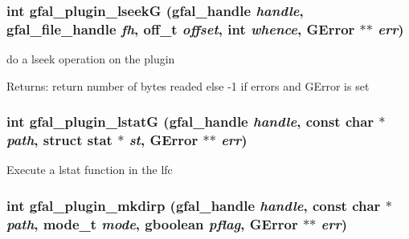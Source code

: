 \subsubsection{\setlength{\rightskip}{0pt plus 5cm}int gfal\_\-plugin\_\-lseek\-G (gfal\_\-handle {\em handle}, gfal\_\-file\_\-handle {\em fh}, off\_\-t {\em offset}, int {\em whence}, GError $\ast$$\ast$ {\em err})}\label{gfal__common__plugin_8c_c29b06ae43aa86049b513d1174393019}


do a lseek operation on the plugin \begin{Desc}
\item[Returns:]return number of bytes readed else -1 if errors and GError is set \end{Desc}
\subsubsection{\setlength{\rightskip}{0pt plus 5cm}int gfal\_\-plugin\_\-lstat\-G (gfal\_\-handle {\em handle}, const char $\ast$ {\em path}, struct stat $\ast$ {\em st}, GError $\ast$$\ast$ {\em err})}\label{gfal__common__plugin_8c_81a0d301234958fc59518fb6ce306425}


Execute a lstat function in the lfc 
\subsubsection{\setlength{\rightskip}{0pt plus 5cm}int gfal\_\-plugin\_\-mkdirp (gfal\_\-handle {\em handle}, const char $\ast$ {\em path}, mode\_\-t {\em mode}, gboolean {\em pflag}, GError $\ast$$\ast$ {\em err})}\label{gfal__common__plugin_8c_815a97902a1067b99f9bcc2f63b19e11}


